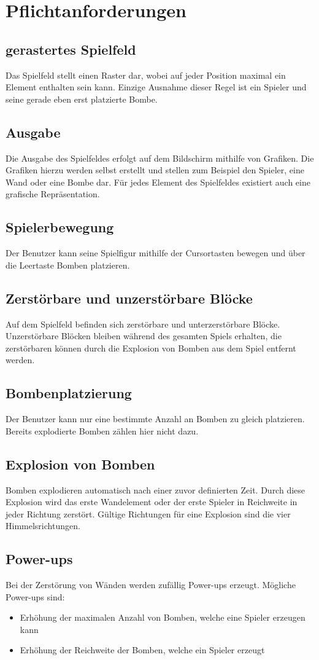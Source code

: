 \documentclass[12pt]{article}
\begin{document}
\section{Pflichtanforderungen}
\subsection{gerastertes Spielfeld}
Das Spielfeld stellt einen Raster dar, wobei auf jeder Position maximal ein Element enthalten sein kann. Einzige Ausnahme dieser Regel ist ein Spieler und seine gerade eben erst platzierte Bombe.
\subsection{Ausgabe}
Die Ausgabe des Spielfeldes erfolgt auf dem Bildschirm mithilfe von Grafiken. Die Grafiken hierzu werden selbst erstellt und stellen zum Beispiel den Spieler, eine Wand oder eine Bombe dar. Für jedes Element des Spielfeldes existiert auch eine grafische Repräsentation.
\subsection{Spielerbewegung}
Der Benutzer kann seine Spielfigur mithilfe der Cursortasten bewegen und über die Leertaste Bomben platzieren.
\subsection{Zerstörbare und unzerstörbare Blöcke}
Auf dem Spielfeld befinden sich zerstörbare und unterzerstörbare Blöcke. Unzerstörbare Blöcken bleiben während des gesamten Spiels erhalten, die zerstörbaren können durch die Explosion von Bomben aus dem Spiel entfernt werden.
\subsection{Bombenplatzierung}
Der Benutzer kann nur eine bestimmte Anzahl an Bomben zu gleich platzieren. Bereits explodierte Bomben zählen hier nicht dazu.
\subsection{Explosion von Bomben}
Bomben explodieren automatisch nach einer zuvor definierten Zeit. Durch diese Explosion wird das erste Wandelement oder der erste Spieler in Reichweite in jeder Richtung zerstört. Gültige Richtungen für eine Explosion sind die vier Himmelsrichtungen.
\subsection{Power-ups}
Bei der Zerstörung von Wänden werden zufällig Power-ups erzeugt. Mögliche Power-ups sind: 
\begin{itemize}
	\item Erhöhung der maximalen Anzahl von Bomben, welche eine Spieler erzeugen kann
	\item Erhöhung der Reichweite der Bomben, welche ein Spieler erzeugt
\end{itemize}
\end{document}

